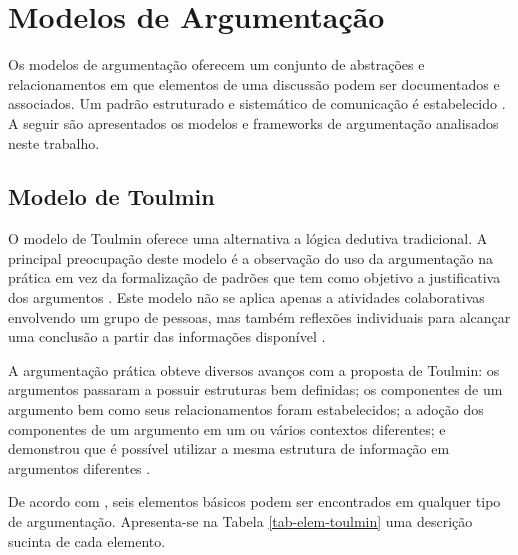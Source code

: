 \section{Modelos de Argumentação}
\label{mod-arg}

Os modelos de argumentação oferecem um conjunto de abstrações e relacionamentos em que elementos de uma discussão podem ser documentados e associados. Um padrão estruturado e sistemático de comunicação é estabelecido \cite{relvas2006}. A seguir são apresentados os modelos e frameworks de argumentação analisados neste trabalho.

\subsection{Modelo de Toulmin}

O modelo de Toulmin \cite{toulmin1958uses} oferece uma alternativa a lógica dedutiva tradicional. A principal preocupação deste modelo é a observação do uso da argumentação na prática em vez da formalização de padrões que tem como objetivo a justificativa dos argumentos \cite{benoit1992readings}. Este modelo não se aplica apenas a atividades colaborativas envolvendo um grupo de pessoas, mas também reflexões individuais para alcançar uma conclusão a partir das informações disponível \cite{hitchcock2005}.

A argumentação prática obteve diversos avanços com a proposta de Toulmin: os argumentos passaram a possuir estruturas bem definidas; os componentes de um argumento bem como seus relacionamentos foram estabelecidos; a adoção dos componentes de um argumento em um ou vários contextos diferentes; e demonstrou que é possível utilizar a mesma estrutura de informação em argumentos diferentes \cite{Gasper1998arg}.

De acordo com , seis elementos básicos podem ser encontrados em qualquer tipo de argumentação. Apresenta-se na Tabela \ref{tab-elem-toulmin} uma descrição sucinta de cada elemento.

